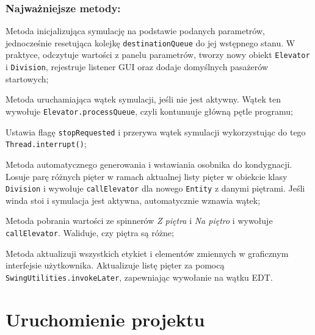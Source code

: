 \documentclass[12pt, a4paper]{article}
\begin{document}
\subsubsection{Najważniejsze metody:}
\label{gui:metody}

\begin{description}[leftmargin=1cm, style=nextline]
  \item[\texttt{initSimulationFromInputs()}]
    Metoda inicjalizująca symulację na podstawie podanych parametrów, jednocześnie resetująca kolejkę \texttt{destinationQueue} do jej wstępnego stanu. 
    W praktyce, odczytuje wartości z panelu parametrów, tworzy nowy obiekt \texttt{Elevator} i \texttt{Division}, rejestruje listener GUI oraz dodaje 
    domyślnych pasażerów startowych;

  \item[\texttt{startSimulationThread()}]
    Metoda uruchamiająca wątek symulacji, jeśli nie jest aktywny. Wątek ten wywołuje \texttt{Elevator.processQueue}, czyli kontunuuje główną pętle programu;

  \item[\texttt{stopSimulation()}]
    Ustawia flagę \texttt{stopRequested} i przerywa wątek symulacji wykorzystując do tego \texttt{Thread.interrupt()};

  \item[\texttt{spawnRandomPassenger()}]
    Metoda automatycznego generowania i wstawiania osobnika do kondygnacji. Losuje parę różnych pięter w ramach aktualnej listy pięter w obiekcie klasy \texttt{Division} 
    i wywołuje \texttt{callElevator} dla nowego \texttt{Entity} z danymi piętrami. Jeśli winda stoi i symulacja jest aktywna, automatycznie wznawia wątek;

  \item[\texttt{addManualPassenger()}]
    Metoda pobrania wartości ze spinnerów \emph{Z piętra} i \emph{Na piętro} i wywołuje \texttt{callElevator}. Waliduje, czy piętra są różne;

  \item[\texttt{updateUIState()}]
    Metoda aktualizuji wszystkich etykiet i elementów zmiennych w graficznym interfejsie użytkownika. Aktualizuje listę pięter za pomocą \texttt{SwingUtilities.invokeLater}, 
    zapewniając wywołanie na wątku EDT.
\end{description}

\section{Uruchomienie projektu}
\label{sec:uruchomienie}
\end{document}
